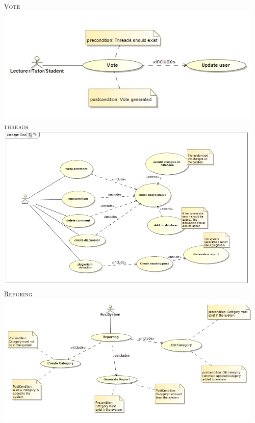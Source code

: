 \documentclass[a4paper,12pt]{report}
\begin{document}
\textsc{Vote}
\emph{}\\
\includegraphics[width=1\textwidth]{./Use_Case_Diagram_Vote.jpg}\\[0.4cm]

\newpage
\textsc{threads}
\emph{}\\
\includegraphics[width=1\textwidth]{./uthreads.jpg}\\[0.4cm]  

\textsc{Reporing}
\emph{}\\
\includegraphics[width=1\textwidth]{./Activity_Diagram_CreateCategory.jpg}\\[0.4cm]
\end{document}
